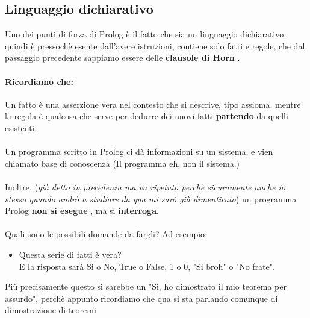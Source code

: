 \documentclass[12pt, a4paper, openany, oneside]{book}
\begin{document}
\subsection{Linguaggio dichiarativo}
Uno dei punti di forza di Prolog è il fatto che sia un linguaggio dichiarativo,
quindi è pressochè esente dall'avere istruzioni, contiene solo fatti e regole,
che dal passaggio precedente sappiamo essere delle \color{blue} 
\textbf{clausole di Horn} \color{black}. 
\paragraph{Ricordiamo che: } Un fatto è una asserzione vera nel contesto che si 
descrive, tipo assioma, mentre la regola è qualcosa che serve per dedurre dei 
nuovi fatti \textbf{partendo} da quelli esistenti. \\ \\
Un programma scritto in Prolog ci dà informazioni su un sistema, e vien chiamato
\color{red} base di conoscenza \color{black} (Il programma eh, non il sistema.)
\\ \\
Inoltre, (\textit{già detto in precedenza ma va ripetuto perchè sicuramente anche io 
stesso quando andrò a studiare da qua mi sarò già dimenticato}) un programma 
Prolog \color{red} \textbf{non si esegue} \color{black}, ma si \textbf{interroga}.
\\ \\
Quali sono le possibili domande da fargli? Ad esempio:
\begin{itemize}
	\item Questa serie di fatti è vera? \\
	E la risposta sarà \color{britishracinggreen}Si \color{black} o \color{red}No, 
	\color{britishracinggreen}True \color{black} o \color{red}False, \color{britishracinggreen}1
	\color{black} o \color{red}0, \color{britishracinggreen}"Si broh" \color{black} o 
	\color{red}"No frate".
\end{itemize}
Più precisamente questo sì sarebbe un "Sì, ho dimostrato il mio teorema per 
assurdo", perchè appunto ricordiamo che qua si sta parlando comunque di 
dimostrazione di teoremi
\end{document}
